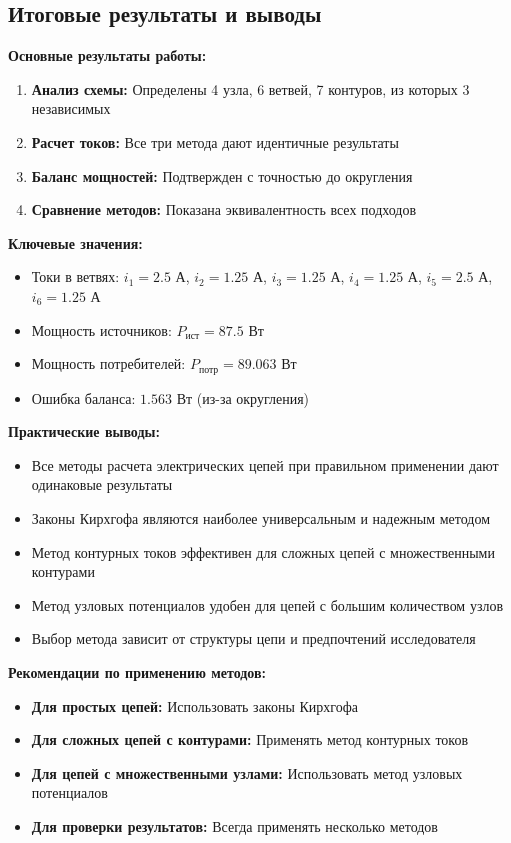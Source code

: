\subsection{Итоговые результаты и выводы}

\textbf{Основные результаты работы:}

\begin{enumerate}
    \item \textbf{Анализ схемы:} Определены 4 узла, 6 ветвей, 7 контуров, из которых 3 независимых
    \item \textbf{Расчет токов:} Все три метода дают идентичные результаты
    \item \textbf{Баланс мощностей:} Подтвержден с точностью до округления
    \item \textbf{Сравнение методов:} Показана эквивалентность всех подходов
\end{enumerate}

\textbf{Ключевые значения:}
\begin{itemize}
    \item Токи в ветвях: $i_1 = 2.5$ А, $i_2 = 1.25$ А, $i_3 = 1.25$ А, $i_4 = 1.25$ А, $i_5 = 2.5$ А, $i_6 = 1.25$ А
    \item Мощность источников: $P_{ист} = 87.5$ Вт
    \item Мощность потребителей: $P_{потр} = 89.063$ Вт
    \item Ошибка баланса: $1.563$ Вт (из-за округления)
\end{itemize}

\textbf{Практические выводы:}
\begin{flushleft}
\begin{itemize}
    \item Все методы расчета электрических цепей при правильном применении дают одинаковые результаты
    \item Законы Кирхгофа являются наиболее универсальным и надежным методом
    \item Метод контурных токов эффективен для сложных цепей с множественными контурами
    \item Метод узловых потенциалов удобен для цепей с большим количеством узлов
    \item Выбор метода зависит от структуры цепи и предпочтений исследователя
\end{itemize}
\end{flushleft}

\textbf{Рекомендации по применению методов:}
\begin{flushleft}
\begin{itemize}
    \item \textbf{Для простых цепей:} Использовать законы Кирхгофа
    \item \textbf{Для сложных цепей с контурами:} Применять метод контурных токов
    \item \textbf{Для цепей с множественными узлами:} Использовать метод узловых потенциалов
    \item \textbf{Для проверки результатов:} Всегда применять несколько методов
\end{itemize}
\end{flushleft}



